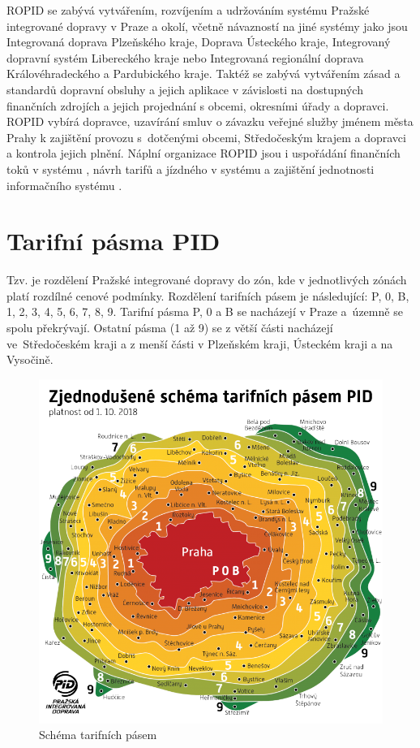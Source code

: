ROPID se zabývá vytvářením, rozvíjením a udržováním systému Pražské integrované dopravy v Praze a okolí,
včetně návazností na jiné systémy jako jsou Integrovaná doprava Plzeňského kraje,
Doprava Ústeckého kraje, Integrovaný dopravní systém Libereckého kraje nebo 
Integrovaná regionální doprava Královéhradeckého a Pardubického kraje.
Taktéž se zabývá vytvářením zásad a standardů dopravní obsluhy a jejich aplikace v závislosti
na dostupných finančních zdrojích a jejich projednání s obcemi, okresními úřady a dopravci.
ROPID vybírá dopravce, uzavírání smluv o závazku veřejné služby jménem města Prahy 
k zajištění provozu  s~dotčenými obcemi, Středočeským krajem a dopravci a kontrola jejich plnění.
Náplní organizace ROPID jsou i uspořádání finančních toků v systému , návrh tarifů a jízdného v systému  a
zajištění jednotnosti informačního systému .  \cite{wikipedia-ropid}

\section{Tarifní pásma PID}
                    
Tzv.  je rozdělení Pražské integrované dopravy do zón, kde v jednotlivých
zónách platí rozdílné cenové podmínky. Rozdělení tarifních pásem je následující:
P, 0, B, 1, 2, 3, 4, 5, 6, 7, 8, 9. Tarifní pásma P, 0 a B se nacházejí v Praze a~územně
se spolu překrývají. Ostatní pásma (1 až 9) se z větší části nacházejí ve~Středočeském kraji a z
menší části v Plzeňském kraji, Ústeckém kraji a na Vysočině.

\begin{figure}[H] \centering
    \includegraphics[width=350pt]{./pictures/pasma-schema.png}
    \caption[Schéma tarifních pásem ]{Schéma tarifních pásem  \cite{pid}}
	\label{fig:pasma-schema}                                
\end{figure}

